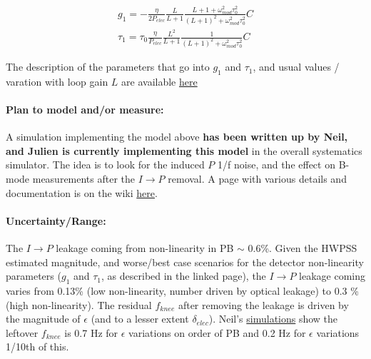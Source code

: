 \begin{align}
g_1 = -\frac{\eta}{2 P_{elec}} \frac{L}{L+1} \frac{L+1+\omega_{mod}^2 \tau_0^2}{(L+1)^2 + \omega_{mod}^2 \tau_0^2} C \\
\tau_1 = \tau_0 \frac{\eta}{P_{elec}} \frac{L^2}{L+1} \frac{1}{(L+1)^2 + \omega_{mod}^2 \tau_0^2} C
\end{align}

\noindent The description of the parameters that go into $g_1$ and $\tau_1$, and usual values / varation with loop gain $L$ are available \href{http://simonsobservatory.wdfiles.com/local--files/calandsys-telecon/hwp_systematics_pipeline_2017-05-17.pdf?ukey=b7162749d5391f6bfc1b0d7e0ed84ab97c96f6a8}{here}
  
\paragraph{Plan to model and/or measure:}
A simulation implementing the model above \textbf{has been written up by Neil, and Julien is currently implementing this model} in the overall systematics simulator. The idea is to look for the induced $P$ 1/f noise, and the effect on B-mode measurements after the $I \rightarrow P$ removal. A page with various details and documentation is on the wiki \href{http://simonsobservatory.wikidot.com/estimationof-hwpss}{here}.


\paragraph{Uncertainty/Range:}
The $I \rightarrow P$ leakage coming from non-linearity in PB $\sim$ 0.6\%. Given the HWPSS estimated magnitude, and worse/best case scenarios for the detector non-linearity parameters ($g_1$ and $\tau_1$, as described in the linked page), the $I \rightarrow P$ leakage coming varies from 0.13\% (low non-linearity, number driven by optical leakage) to 0.3 \% (high non-linearity). The residual $f_{knee}$ after removing the leakage is driven by the magnitude of $\epsilon$ (and to a lesser extent $\delta_{elec}$). Neil's \href{http://simonsobservatory.wdfiles.com/local--files/estimationof-hwpss/Estimating_Ell_Knee_for_SOLA.pdf?ukey=886f3c1ad56d36de42412c02765a1a658a35fad9}{simulations} show the leftover $f_{knee}$ is 0.7 Hz for $\epsilon$ variations on order of PB and 0.2 Hz for $\epsilon$ variations 1/10th of this.



